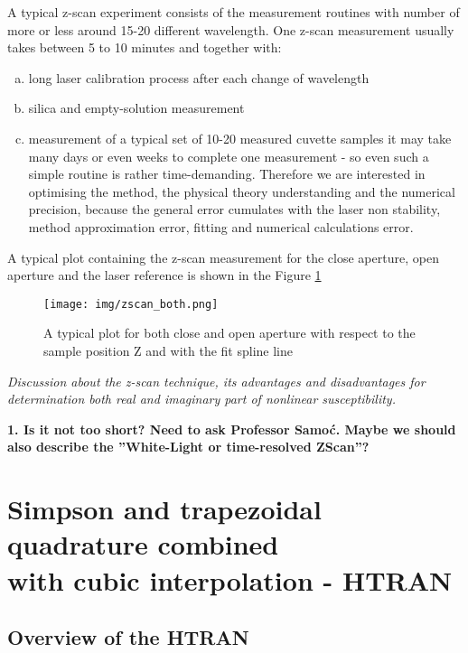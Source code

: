 \documentclass[12pt,twoside,a4paper]{article}
\numberwithin{equation}{subsection}
\numberwithin{figure}{subsection}
\begin{document}
A typical z-scan experiment consists of the measurement routines with number of more or less around 15-20 different wavelength. One
z-scan measurement usually takes between 5 to 10 minutes and together with:
\begin{enumerate}[(a)]
  \item long laser calibration process after each change of wavelength
  \item silica and empty-solution measurement
  \item measurement of a typical set of 10-20 measured cuvette samples it may take many days or even weeks to complete one
  measurement - so even such a simple routine is rather time-demanding. Therefore we are interested in optimising the method, the
  physical theory understanding and the numerical precision, because the general error cumulates with the laser non stability,
  method approximation error, fitting and numerical calculations error. 
\end{enumerate}

A typical plot containing the z-scan measurement for  the close aperture, open aperture and the laser reference is shown in the
Figure \ref{fig:zscan_both}

\begin{figure} 
  \texttt{[image: img/zscan\_both.png]}
  \caption{A typical plot for both close and open aperture with respect to the sample position Z and with the fit spline line
  \label{fig:zscan_both}} 
\end{figure}

\textit{Discussion about the z-scan technique, its advantages and disadvantages for determination both real and imaginary part of
nonlinear susceptibility.}

\textbf{1. Is it not too short? Need to ask Professor Samoć. Maybe we should also describe the ''White-Light or time-resolved ZScan''?}  

\section{Simpson and trapezoidal quadrature com\-bi\-ned \\ with cu\-bic in\-ter\-po\-la\-tion - HTRAN}
\label{chap:htran}

\subsection{Overview of the HTRAN} \label{chap:htran_overview}
\end{document}

